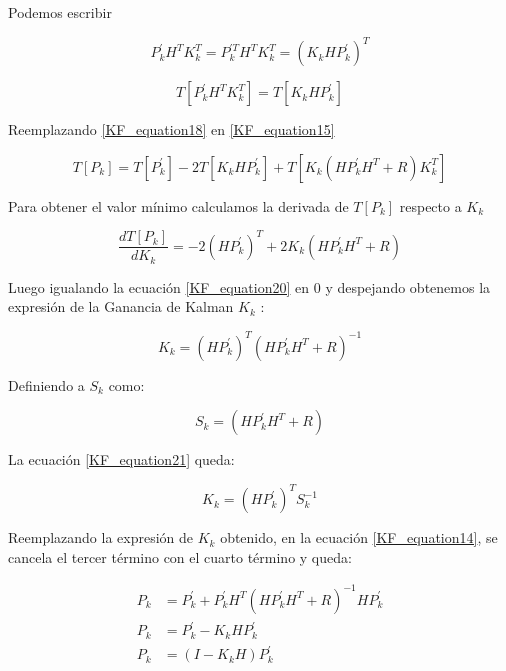 \documentclass[10pt,a4paper]{article}
\begin{document}
	Podemos escribir
	
	\begin{equation}
		P^\prime_k H^T K^T_k = P^{\prime T}_k H^T K^T_k = (K_k H P^\prime_k )^T
		\label{KF_equation17}
	\end{equation}	
	
	\begin{equation}
		T[P^\prime_k H^T K^T_k] = T[K_k H P^\prime_k]
		\label{KF_equation18}
	\end{equation}	
	
	Reemplazando \ref{KF_equation18} en \ref{KF_equation15}

	\begin{equation}
		T[P_k] = T[P^\prime_k] -2 T[K_k H P^\prime_k] + T[K_k (H P^\prime_k H^T + R) K^T_k]
		\label{KF_equation19}
	\end{equation}	
	
	Para obtener el valor mínimo calculamos la derivada de $T[P_k]$ respecto a $K_k$
	
	\begin{equation}
		\frac{dT[P_k]}{dK_k} = -2 (H P^\prime_k)^T + 2K_k (H P^\prime_k H^T + R)
		\label{KF_equation20}
	\end{equation}	
	
	Luego igualando la ecuación \ref{KF_equation20} en 0 y despejando obtenemos la expresión de la Ganancia de Kalman $K_k$ :
	
	\begin{equation}
		K_k = (H P^\prime_k)^T (H P^\prime_k H^T + R)^{-1} 
		\label{KF_equation21}
	\end{equation}	
	
	Definiendo a $S_k$ como:
	
			\begin{equation}
				S_k = (H P^\prime_k H^T + R)
				\label{KF_equation22}
			\end{equation}	
	
	La ecuación \ref{KF_equation21} queda:
	
	\begin{equation}
		K_k = (H P^\prime_k)^T S_k^{-1} 
		\label{K_Gain}
	\end{equation}	
	
	Reemplazando la expresión de $K_k$ obtenido, en la ecuación  \ref{KF_equation14}, se cancela el tercer término con el cuarto término y queda:
	
	\begin{align}
		P_k  &= P^\prime_k + P^\prime_k H^T (H P^\prime_k H^T + R)^{-1} H P^\prime_k \nonumber \\
		P_k  &= P^\prime_k - K_k H P^\prime_k \nonumber\\
		P_k  &= (I - K_k H) P^\prime_k	
		\label{KF_equation23}	
	\end{align}
	
\end{document}
